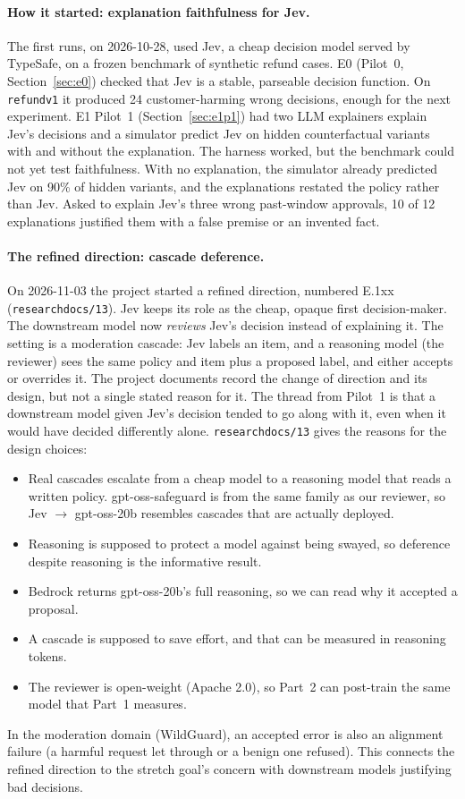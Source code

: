 \documentclass[11pt]{article}
\renewcommand{\_}{\origunderscore\allowbreak}
\begin{document}
\paragraph{How it started: explanation faithfulness for Jev.} The first runs, on 2026-10-28, used Jev, a cheap decision model served by TypeSafe, on a frozen benchmark of synthetic refund cases. E0 (Pilot~0, Section~\ref{sec:e0}) checked that Jev is a stable, parseable decision function. On \texttt{refund\_v1} it produced 24 customer-harming wrong decisions, enough for the next experiment. E1 Pilot~1 (Section~\ref{sec:e1p1}) had two LLM explainers explain Jev's decisions and a simulator predict Jev on hidden counterfactual variants with and without the explanation. The harness worked, but the benchmark could not yet test faithfulness. With no explanation, the simulator already predicted Jev on 90\% of hidden variants, and the explanations restated the policy rather than Jev. Asked to explain Jev's three wrong past-window approvals, 10 of 12 explanations justified them with a false premise or an invented fact.

\paragraph{The refined direction: cascade deference.} On 2026-11-03 the project started a refined direction, numbered E.1xx (\texttt{research\_docs/13}). Jev keeps its role as the cheap, opaque first decision-maker. The downstream model now \emph{reviews} Jev's decision instead of explaining it. The setting is a moderation cascade: Jev labels an item, and a reasoning model (the reviewer) sees the same policy and item plus a proposed label, and either accepts or overrides it. The project documents record the change of direction and its design, but not a single stated reason for it. The thread from Pilot~1 is that a downstream model given Jev's decision tended to go along with it, even when it would have decided differently alone. \texttt{research\_docs/13} gives the reasons for the design choices:
\begin{itemize}[leftmargin=*,itemsep=2pt]
  \item Real cascades escalate from a cheap model to a reasoning model that reads a written policy. gpt-oss-safeguard is from the same family as our reviewer, so Jev $\rightarrow$ gpt-oss-20b resembles cascades that are actually deployed.
  \item Reasoning is supposed to protect a model against being swayed, so deference despite reasoning is the informative result.
  \item Bedrock returns gpt-oss-20b's full reasoning, so we can read why it accepted a proposal.
  \item A cascade is supposed to save effort, and that can be measured in reasoning tokens.
  \item The reviewer is open-weight (Apache 2.0), so Part~2 can post-train the same model that Part~1 measures.
\end{itemize}
In the moderation domain (WildGuard), an accepted error is also an alignment failure (a harmful request let through or a benign one refused). This connects the refined direction to the stretch goal's concern with downstream models justifying bad decisions.
\end{document}
